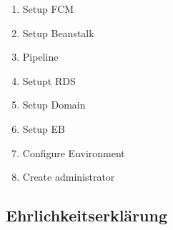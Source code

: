         \begin{enumerate}
            \item Setup FCM
            \item Setup Beanstalk
            \item Pipeline
            \item Setupt RDS
            \item Setup Domain
            \item Setup EB
            \item Configure Environment
            \item Create administrator
        \end{enumerate}

    \subsection{Ehrlichkeitserklärung}
